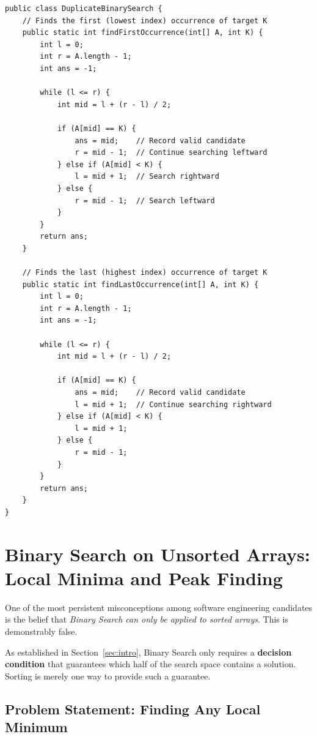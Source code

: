 \documentclass[10pt,journal,compsoc,onecolumn]{IEEEtran}
\begin{document}
\begin{verbatim}
public class DuplicateBinarySearch {
    // Finds the first (lowest index) occurrence of target K
    public static int findFirstOccurrence(int[] A, int K) {
        int l = 0;
        int r = A.length - 1;
        int ans = -1;

        while (l <= r) {
            int mid = l + (r - l) / 2;

            if (A[mid] == K) {
                ans = mid;    // Record valid candidate
                r = mid - 1;  // Continue searching leftward
            } else if (A[mid] < K) {
                l = mid + 1;  // Search rightward
            } else {
                r = mid - 1;  // Search leftward
            }
        }
        return ans;
    }

    // Finds the last (highest index) occurrence of target K
    public static int findLastOccurrence(int[] A, int K) {
        int l = 0;
        int r = A.length - 1;
        int ans = -1;

        while (l <= r) {
            int mid = l + (r - l) / 2;

            if (A[mid] == K) {
                ans = mid;    // Record valid candidate
                l = mid + 1;  // Continue searching rightward
            } else if (A[mid] < K) {
                l = mid + 1;
            } else {
                r = mid - 1;
            }
        }
        return ans;
    }
}
\end{verbatim}

\section{Binary Search on Unsorted Arrays: Local Minima and Peak Finding}
\label{sec:local_minima}

One of the most persistent misconceptions among software engineering candidates is the belief that \emph{Binary Search can only be applied to sorted arrays}. This is demonstrably false.

As established in Section~\ref{sec:intro}, Binary Search only requires a \textbf{decision condition} that guarantees which half of the search space contains a solution. Sorting is merely one way to provide such a guarantee.

\subsection{Problem Statement: Finding Any Local Minimum}
\end{document}
